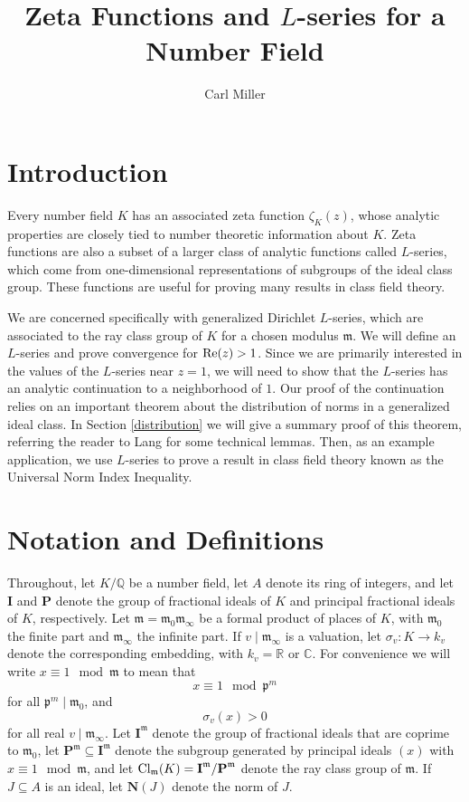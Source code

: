 \documentclass{amsart}
\def\QQ{{\mathbb Q}}
\def\RR{{\mathbb R}}
\def\CC{{\mathbb C}}
\def\mf{\mathfrak}
\def\CC{\mathbb{C}}   %
\def\RR{\mathbb{R}}   %
\def\Cl{\textnormal{Cl}}
\def\bI{\textbf{I}}
\def\bP{\textbf{P}}
\def\bN{\textbf{N}}
\def\Re{\textnormal{Re}}
\theoremstyle{definition}
\theoremstyle{remark}
\begin{document}
\title{Zeta Functions and $L$-series for a Number Field}

\author{Carl Miller}

\maketitle

\section{Introduction}

Every number field $K$ has an associated zeta function
$\zeta_K(z)$, whose analytic properties are closely tied to number
theoretic information about $K$. Zeta functions are also a subset
of a larger class of analytic functions called $L$-series, which
come from one-dimensional representations of subgroups of the
ideal class group.  These functions are useful for proving many
results in class field theory.

We are concerned specifically with generalized Dirichlet
$L$-series, which are associated to the ray class group of $K$
for a chosen modulus $\mf{m}$. We will define an $L$-series and
prove convergence for $\Re(z) > 1$.  Since we are primarily
interested in the values of the $L$-series near $z=1$, we will
need to show that the $L$-series has an analytic continuation to a
neighborhood of $1$.  Our proof of the continuation relies on an
important theorem about the distribution of norms in a
generalized ideal class.  In Section \ref{distribution} we will
give a summary proof of this theorem, referring the reader to
Lang for some technical lemmas. Then, as an example application,
we use $L$-series to prove a result in class field theory known
as the Universal Norm Index Inequality.

\section{Notation and Definitions}

Throughout, let $K/\QQ$ be a number field, let $A$ denote its
ring of integers, and let $\bI$ and $\bP$ denote the group of
fractional ideals of $K$ and principal fractional ideals of $K$,
respectively.  Let $\mf{m} = \mf{m}_0 \mf{m}_\infty$ be a formal
product of places of $K$, with $\mf{m}_0$ the finite part and
$\mf{m}_\infty$ the infinite part.  If $v \mid \mf{m}_\infty$ is
a valuation, let $\sigma_v : K \to k_v$ denote the corresponding
embedding, with $k_v = \RR$ or $\CC$.  For convenience we will
write $x \equiv 1 \mod \mf{m}$ to mean that
\[
x \equiv 1 \mod \mf{p}^m
\]
for all $\mf{p}^m \mid \mf{m}_0$, and
\[
\sigma_v(x) > 0
\]
for all real $v \mid \mf{m}_\infty$.  Let $\bI^\mf{m}$ denote the
group of fractional ideals that are coprime to $\mf{m}_0$, let
$\bP^\mf{m} \subseteq \bI^\mf{m}$ denote the subgroup generated
by principal ideals $(x)$ with $x \equiv 1 \mod \mf{m}$, and let
$\Cl_\mf{m}(K) = \bI^\mf{m} / \bP^\mf{m}$ denote the ray class
group of $\mf{m}$. If $J \subseteq A$ is an ideal, let $\bN (J)$
denote the norm of $J$.
\end{document}
